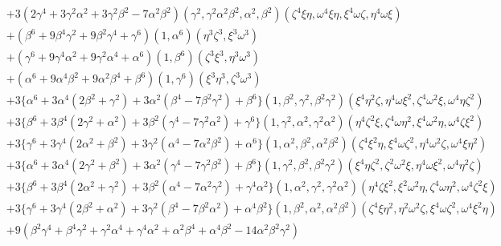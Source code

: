 \documentclass[11pt,a4paper]{article}
\begin{document}
\[\begin{aligned}
& + 3 (2 \gamma^4 + 3 \gamma^2 \alpha^2 + 3 \gamma^2 \beta^2 - 7 \alpha^2 \beta^2)(\gamma^2, \gamma^2 \alpha^2 \beta^2, \alpha^2, \beta^2)(\zeta^4 \xi \eta, \omega^4 \xi \eta, \xi^4 \omega \zeta, \eta^4 \omega \xi) \\[2pt]
& + (\beta^6 + 9 \beta^4 \gamma^2 + 9 \beta^2 \gamma^4 + \gamma^6)(1, \alpha^6)(\eta^3 \zeta^3, \xi^3 \omega^3) \\
& + (\gamma^6 + 9 \gamma^4 \alpha^2 + 9 \gamma^2 \alpha^4 + \alpha^6)(1, \beta^6)(\zeta^3 \xi^3, \eta^3 \omega^3) \\
& + (\alpha^6 + 9 \alpha^4 \beta^2 + 9 \alpha^2 \beta^4 + \beta^6)(1, \gamma^6)(\xi^3 \eta^3, \zeta^3 \omega^3) \\[2pt]
& + 3 \bigl\{ \alpha^6 + 3 \alpha^4 (2 \beta^2 + \gamma^2) + 3 \alpha^2 (\beta^4 - 7 \beta^2 \gamma^2) + \beta^6 \bigr\}
   (1, \beta^2, \gamma^2, \beta^2 \gamma^2)(\xi^4 \eta^2 \zeta, \eta^4 \omega \xi^2, \zeta^4 \omega^2 \xi, \omega^4 \eta \zeta^2) \\
& + 3 \bigl\{ \beta^6 + 3 \beta^4 (2 \gamma^2 + \alpha^2) + 3 \beta^2 (\gamma^4 - 7 \gamma^2 \alpha^2) + \gamma^6 \bigr\}
   (1, \gamma^2, \alpha^2, \gamma^2 \alpha^2)(\eta^4 \zeta^2 \xi, \zeta^4 \omega \eta^2, \xi^4 \omega^2 \eta, \omega^4 \zeta \xi^2) \\
& + 3 \bigl\{ \gamma^6 + 3 \gamma^4 (2 \alpha^2 + \beta^2) + 3 \gamma^2 (\alpha^4 - 7 \alpha^2 \beta^2) + \alpha^6 \bigr\}
   (1, \alpha^2, \beta^2, \alpha^2 \beta^2)(\zeta^4 \xi^2 \eta, \xi^4 \omega \zeta^2, \eta^4 \omega^2 \zeta, \omega^4 \xi \eta^2) \\
& + 3 \bigl\{ \alpha^6 + 3 \alpha^4 (2 \gamma^2 + \beta^2) + 3 \alpha^2 (\gamma^4 - 7 \gamma^2 \beta^2) + \beta^6 \bigr\}
   (1, \gamma^2, \beta^2, \beta^2 \gamma^2)(\xi^4 \eta \zeta^2, \zeta^2 \omega^2 \xi, \eta^4 \omega \xi^2, \omega^4 \eta^2 \zeta) \\
& + 3 \bigl\{ \beta^6 + 3 \beta^4 (2 \alpha^2 + \gamma^2) + 3 \beta^2 (\alpha^4 - 7 \alpha^2 \gamma^2) + \gamma^4 \alpha^2 \bigr\}
   (1, \alpha^2, \gamma^2, \gamma^2 \alpha^2)(\eta^4 \zeta \xi^2, \xi^2 \omega^2 \eta, \zeta^4 \omega \eta^2, \omega^4 \zeta^2 \xi) \\
& + 3 \bigl\{ \gamma^6 + 3 \gamma^4 (2 \beta^2 + \alpha^2) + 3 \gamma^2 (\beta^4 - 7 \beta^2 \alpha^2) + \alpha^4 \beta^2 \bigr\}
   (1, \beta^2, \alpha^2, \alpha^2 \beta^2)(\zeta^4 \xi \eta^2, \eta^2 \omega^2 \zeta, \xi^4 \omega \zeta^2, \omega^4 \xi^2 \eta) \\[2pt]
& + 9 (\beta^2 \gamma^4 + \beta^4 \gamma^2 + \gamma^2 \alpha^4 + \gamma^4 \alpha^2 + \alpha^2 \beta^4 + \alpha^4 \beta^2 - 14 \alpha^2 \beta^2 \gamma^2)

\end{aligned}\]
\end{document}
